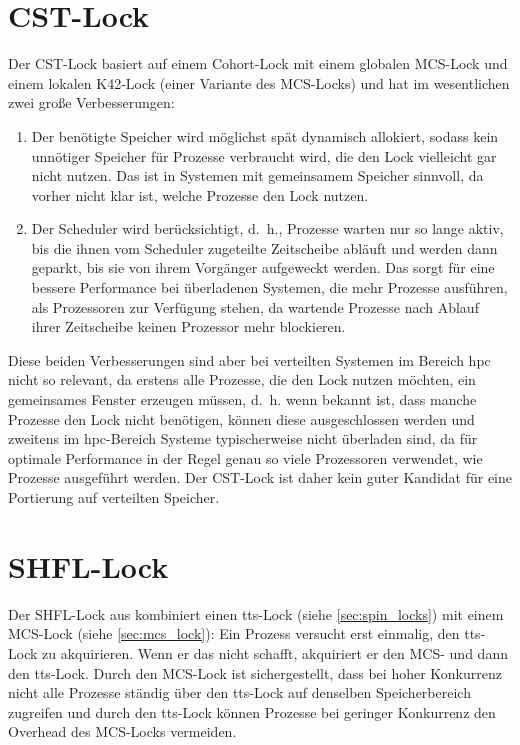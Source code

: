 \clearpage

\section{CST-Lock}
\label{sec:cst-lock}

Der CST-Lock \cite{CST-Lock} basiert auf einem Cohort-Lock \cite{Cohort-Lock}
mit einem globalen MCS-Lock \cite{MCS-Lock} und einem lokalen K42-Lock \cite{K42-Lock} (einer Variante des MCS-Locks)
und hat im wesentlichen zwei große Verbesserungen:
\begin{enumerate}
    \item Der benötigte Speicher wird möglichst spät dynamisch allokiert,
          sodass kein unnötiger Speicher für Prozesse verbraucht wird,
          die den Lock vielleicht gar nicht nutzen.
          Das ist in Systemen mit gemeinsamem Speicher sinnvoll,
          da vorher nicht klar ist,
          welche Prozesse den Lock nutzen.
    \item Der Scheduler wird berücksichtigt,
          d.~h., Prozesse warten nur so lange aktiv,
          bis die ihnen vom Scheduler zugeteilte Zeitscheibe abläuft
          und werden dann geparkt,
          bis sie von ihrem Vorgänger aufgeweckt werden.
          Das sorgt für eine bessere Performance bei überladenen Systemen,
          die mehr Prozesse ausführen,
          als Prozessoren zur Verfügung stehen,
          da wartende Prozesse nach Ablauf ihrer Zeitscheibe keinen Prozessor mehr blockieren.
\end{enumerate}
Diese beiden Verbesserungen sind aber bei verteilten Systemen im Bereich \gls{hpc} nicht so relevant,
da erstens alle Prozesse,
die den Lock nutzen möchten,
ein gemeinsames \gls{Fenster} erzeugen müssen,
d.~h. wenn bekannt ist,
dass manche Prozesse den Lock nicht benötigen,
können diese ausgeschlossen werden
und zweitens im \gls{hpc}-Bereich Systeme typischerweise nicht überladen sind,
da für optimale Performance in der Regel genau so viele Prozessoren verwendet,
wie Prozesse ausgeführt werden.
Der CST-Lock ist daher kein guter Kandidat für eine Portierung auf verteilten Speicher.

\section{SHFL-Lock}
\label{sec:shfl-lock}

Der SHFL-Lock aus \cite{Shfl-Lock}
kombiniert einen \gls{tts}-Lock (siehe \autoref{sec:spin_locks})
mit einem MCS-Lock (siehe \autoref{sec:mcs_lock}):
Ein Prozess versucht erst einmalig,
den \gls{tts}-Lock zu akquirieren.
Wenn er das nicht schafft,
akquiriert er den MCS-
und dann den \gls{tts}-Lock.
Durch den MCS-Lock ist sichergestellt,
dass bei hoher Konkurrenz nicht alle Prozesse ständig
über den \gls{tts}-Lock
auf denselben Speicherbereich zugreifen
und durch den \gls{tts}-Lock können Prozesse bei geringer Konkurrenz
den Overhead des MCS-Locks vermeiden.

